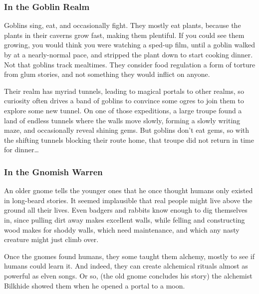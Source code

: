\begin{multicols}{2}

\subsubsection{In the Goblin Realm}

\begin{exampletext}
  Goblins sing, eat, and occasionally fight.
  They mostly eat plants, because the plants in their caverns grow fast, making them plentiful.
  If you could see them growing, you would think you were watching a sped-up film, until a goblin walked by at a nearly-normal pace, and stripped the plant down to start cooking dinner.
  Not that goblins track mealtimes.
  They consider food regulation a form of torture from glum stories, and not something they would inflict on anyone.

  Their realm has myriad tunnels, leading to magical portals to other realms, so curiosity often drives a band of goblins to convince some ogres to join them to explore some new tunnel.
  On one of those expeditions, a large troupe found a land of endless tunnels where the walls move slowly, forming a slowly writing maze, and occasionally reveal shining gems.
  But goblins don't eat gems, so with the shifting tunnels blocking their route home, that troupe did not return in time for dinner\ldots
\end{exampletext}

\subsubsection{In the Gnomish Warren}

\begin{exampletext}
  An older gnome tells the younger ones that he once thought humans only existed in long-beard stories.
  It seemed implausible that real people might live above the ground all their lives.
  Even badgers and rabbits know enough to dig themselves in, since pulling dirt away makes excellent walls, while felling and constructing wood makes for shoddy walls, which need maintenance, and which any nasty creature might just climb over.

  Once the gnomes found humans, they some taught them alchemy, mostly to see if humans could learn it.
  And indeed, they can create alchemical rituals almost as powerful as elven songs.
  Or so, (the old gnome concludes his story) the alchemist Bilkhide showed them when he opened a portal to a moon.
\end{exampletext}


\end{multicols}
